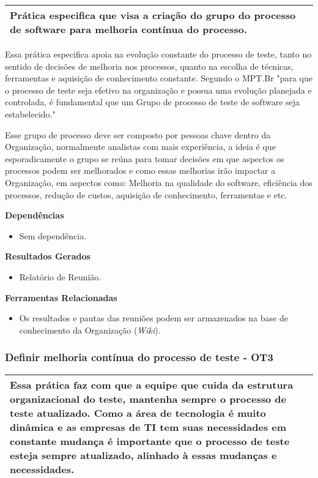 \begin{table}[H]
\centering
\begin{tabular}{|p{130mm}|}
\hline
Prática especifica que visa a criação do grupo do processo de software para melhoria contínua do processo.\\ 
\hline
\end{tabular}
\end{table}

Essa prática especifica apoia na evolução constante do processo de teste, tanto no sentido de decisões de melhoria nos processos, quanto na escolha de técnicas, ferramentas e aquisição de conhecimento constante. Segundo o MPT.Br \cite{GuiaMPTbr} "para que o processo de teste seja efetivo na organização e possua uma evolução planejada e controlada, é fundamental que um Grupo de processo de teste de software seja estabelecido."

Esse grupo de processo deve ser composto por pessoas chave dentro da Organização, normalmente analistas com mais experiência, a ideia é que esporadicamente o grupo se reúna para tomar decisões em que aspectos os processos podem ser melhorados e como essas melhorias irão impactar a Organização, em aspectos como: Melhoria na qualidade do software, eficiência dos processos, redução de custos, aquisição de conhecimento, ferramentas e etc. 

\textbf{Dependências}
\begin{itemize}
    \item Sem dependência.
\end{itemize}

\textbf{Resultados Gerados}
\begin{itemize}
    \item Relatório de Reunião.
\end{itemize}

\textbf{Ferramentas Relacionadas}
\begin{itemize}
    \item Os resultados e pautas das reuniões podem ser armazenados na base de conhecimento da Organização (\textit{Wiki}).
\end{itemize}

\subsubsection{Definir melhoria contínua do processo de teste - OT3}
\label{sec:ot3}

\begin{table}[H]
\centering
\begin{tabular}{|p{130mm}|}
\hline
Essa prática faz com que a equipe que cuida da estrutura organizacional do teste, mantenha sempre o processo de teste atualizado. Como a área de tecnologia é muito dinâmica e as empresas de TI tem suas necessidades em constante mudança é importante que o processo de teste esteja sempre atualizado, alinhado à essas mudanças e necessidades. \\ 
\hline
\end{tabular}
\end{table}


